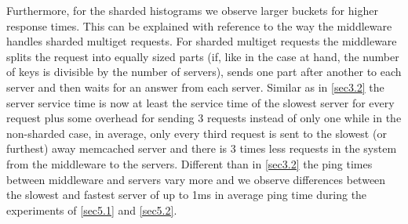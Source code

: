 \documentclass[11pt,a4paper]{article}
\begin{document}
Furthermore, for the sharded histograms we observe larger buckets for higher response times. This can be explained with reference to the way the middleware handles sharded multiget requests. For sharded multiget requests the middleware splits the request into equally sized parts (if, like in the case at hand, the number of keys is divisible by the number of servers), sends one part after another to each server and then waits for an answer from each server. Similar as in \autoref{sec3.2} the server service time is now at least the service time of the slowest server for every request plus some overhead for sending 3 requests instead of only one while in the non-sharded case, in average, only every third request is sent to the slowest (or furthest) away memcached server and there is 3 times less requests in the system from the middleware to the servers. Different than in \autoref{sec3.2} the ping times between middleware and servers vary more and we observe differences between the slowest and fastest server of up to 1ms in average ping time during the experiments of \autoref{sec5.1} and \autoref{sec5.2}.
\end{document}
